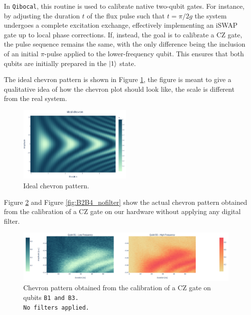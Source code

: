 In \texttt{Qibocal}, this routine is used to calibrate native two-qubit gates. For instance, by adjusting the duration $t$ of the flux pulse such that $t = \pi/2g$ the system undergoes a complete excitation exchange, effectively implementing an iSWAP gate up to local phase corrections.  
If, instead, the goal is to calibrate a CZ gate, the pulse sequence remains the same, with the only difference being the inclusion of an initial $\pi$-pulse applied to the lower-frequency qubit. This ensures that both qubits are initially prepared in the $\ket{1}$ state.

The ideal chevron pattern is shown in Figure \ref{fig:expected_chevron}, the figure is meant to give a qualitative idea of how the chevron plot should look like, the scale is different from the real system.

\begin{figure}[h!]
    \centering
    \includegraphics[width=0.5\textwidth]{figures/png/IdealChevron.png}
    \caption{Ideal chevron pattern.}
    \label{fig:expected_chevron}
\end{figure}

\newpage
{}
Figure \ref{fig:B1B3_nofilter} and Figure \ref{fig:B2B4_nofilter} show the actual chevron pattern obtained from the calibration of a CZ gate on our hardware without applying any digital filter.

\begin{figure}[h!]
    \centering
    \includegraphics[width=\textwidth]{figures/png/Cryoscope/B1B3_nofilter.png}
    \caption{Chevron pattern obtained from the calibration of a CZ gate on qubits \tt{B1} and \tt{B3}.\\ No filters applied.}
    \label{fig:B1B3_nofilter}
\end{figure}

